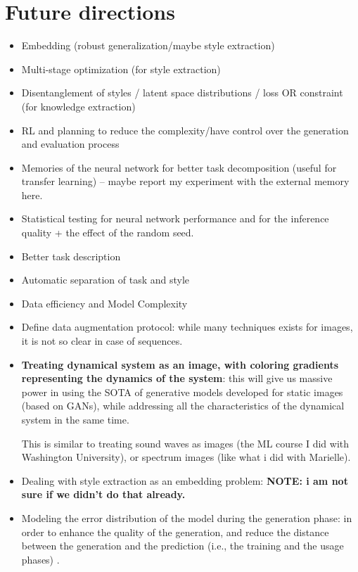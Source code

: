 \section{Future directions}\label{sec:future_direction}
\begin{itemize}[noitemsep]
    \item Embedding (robust generalization/maybe style extraction)
    \item Multi-stage optimization (for style extraction)
    \item Disentanglement of styles / latent space distributions / loss OR constraint (for knowledge extraction)
    \item RL and planning to reduce the complexity/have control over the generation and evaluation process
    \item Memories of the neural network for better task decomposition (useful for transfer learning) -- maybe report my experiment with the external memory here.
    \item Statistical testing for neural network performance and for the inference quality + the effect of the random seed.
    \item Better task description
    \item Automatic separation of task and style
    \item Data efficiency and Model Complexity
    \item Define data augmentation protocol: while many techniques exists for images, it is not so clear in case of sequences.
    \item \textbf{Treating dynamical system as an image, with coloring gradients representing the dynamics of the system}: this will give us massive power in using the SOTA of generative models developed for static images (based on GANs), while addressing all the characteristics of the dynamical system in the same time.

    This is similar to treating sound waves as images (the ML course I did with Washington University), or spectrum images (like what i did with Marielle).

    \item Dealing with style extraction as an embedding problem: \textbf{NOTE: i am not sure if we didn't do that already.}

    \item Modeling the error distribution of the model during the generation phase: in order to enhance the quality of the generation, and reduce the distance between the generation and the prediction (i.e., the training and the usage phases) .


\end{itemize}
